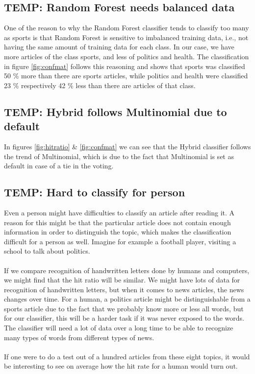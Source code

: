 \subsection{TEMP: Random Forest needs balanced data} %
\label{sub:temp_random_forest_needs_balanced_data}
One of the reason to why the Random Forest classifier tends to classify too many as sports is that Random Forest is sensitive to imbalanced training data, i.e., not having the same amount of training data for each class. In our case, we have more articles of the class sports, and less of politics and health. The classification in figure \ref{fig:confmat} follows this reasoning and shows that sports was classified 50 \% more than there are sports articles, while politics and health were classified 23 \% respectively 42 \% less than there are articles of that class.

\subsection{TEMP: Hybrid follows Multinomial due to default} %
\label{sub:temp_hybrid_follows_multinomial_due_to_default}
In figures \ref{fig:hitratio} \& \ref{fig:confmat} we can see that the Hybrid classifier follows the trend of Multinomial, which is due to the fact that Multinomial is set as default in case of a tie in the voting.

\subsection{TEMP: Hard to classify for person} %
\label{sub:temp_hard_to_classify_for_person}
Even a person might have difficulties to classify an article after reading it. A reason for this might be that the particular article does not contain enough information in order to distinguish the topic, which makes the classification difficult for a person as well. Imagine for example a football player, visiting a school to talk about politics.
\\\\
If we compare recognition of handwritten letters done by humans and computers, we might find that the hit ratio will be similar. We might have lots of data for recognition of handwritten letters, but when it comes to news articles, the news changes over time. For a human, a politics article might be distinguishable from a sports article due to the fact that we probably know more or less all words, but for our classifier, this will be a harder task if it was never exposed to the words. The classifier will need a lot of data over a long time to be able to recognize many types of words from different types of news.
\\\\
If one were to do a test out of a hundred articles from these eight topics, it would be interesting to see on average how the hit rate for a human would turn out.

